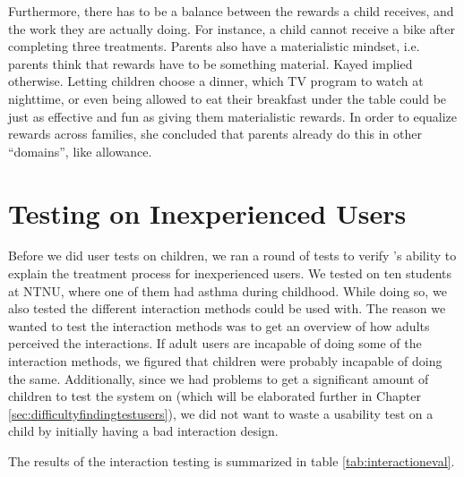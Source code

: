 Furthermore, there has to be a balance between the rewards a child receives, and the work they are actually doing. For instance, a child cannot receive a bike after completing three treatments. Parents also have a materialistic mindset, i.e. parents think that rewards have to be something material. Kayed implied otherwise. Letting children choose a dinner, which TV program to watch at nighttime, or even being allowed to eat their breakfast under the table could be just as effective and fun as giving them materialistic rewards. In order to equalize rewards across families, she concluded that parents already do this in other ``domains'', like allowance.   

\section{Testing \ab{} on Inexperienced Users}
\label{chp:interaction-methods}

Before we did user tests on children, we ran a round of tests to verify \ab{}'s ability to explain the treatment process for inexperienced users. We tested on ten students at NTNU, where one of them had asthma during childhood. While doing so, we also tested the different interaction methods \ab{} could be used with. The reason we wanted to test the interaction methods was to get an overview of how adults perceived the interactions. If adult users are incapable of doing some of the interaction methods, we figured that children were probably incapable of doing the same. Additionally, since we had problems to get a significant amount of children to test the system on (which will be elaborated further in Chapter \ref{sec:difficultyfindingtestusers}), we did not want to waste a usability test on a child by initially having a bad interaction design.         

The results of the interaction testing is summarized in table \ref{tab:interactioneval}.  

